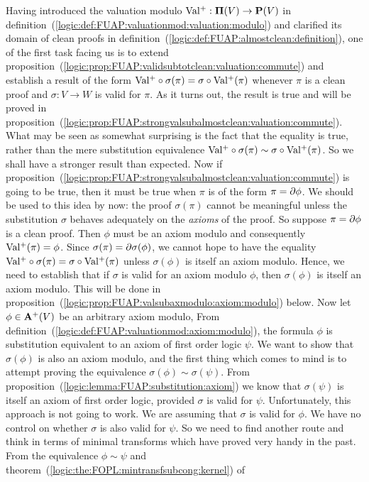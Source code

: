 Having introduced the valuation modulo $\mbox{$\rm Val^{+}$}:\mbox{${\bf\Pi}(V)$}\to\mbox{${\bf P}(V)$}$ in
definition~(\ref{logic:def:FUAP:valuationmod:valuation:modulo}) and
clarified its domain of clean proofs in
definition~(\ref{logic:def:FUAP:almostclean:definition}), one of the
first task facing us is to extend
proposition~(\ref{logic:prop:FUAP:validsubtotclean:valuation:commute})
and establish a result of the form
$\mbox{$\rm Val^{+}$}\circ\sigma(\pi)=\sigma\circ\mbox{$\rm Val^{+}$}(\pi)$ whenever $\pi$ is a
clean proof and $\sigma:V\to W$ is valid for $\pi$. As it turns out,
the result is true and will be proved in
proposition~(\ref{logic:prop:FUAP:strongvalsubalmostclean:valuation:commute}).
What may be seen as somewhat surprising is the fact that the
equality is true, rather than the mere substitution equivalence
$\mbox{$\rm Val^{+}$}\circ\sigma(\pi)\sim\sigma\circ\mbox{$\rm Val^{+}$}(\pi)$. So we shall have a
stronger result than expected. Now if
proposition~(\ref{logic:prop:FUAP:strongvalsubalmostclean:valuation:commute})
is going to be true, then it must be true when $\pi$ is of the form
$\pi=\mbox{$\partial$}\phi$. We should be used to this idea by now: the proof
$\sigma(\pi)$ cannot be meaningful unless the substitution $\sigma$
behaves adequately on the {\em axioms} of the proof. So suppose
$\pi=\mbox{$\partial$}\phi$ is a clean proof. Then $\phi$ must be an axiom modulo
and consequently $\mbox{$\rm Val^{+}$}(\pi)=\phi$. Since
$\sigma(\pi)=\mbox{$\partial$}\sigma(\phi)$, we cannot hope to have the equality
$\mbox{$\rm Val^{+}$}\circ\sigma(\pi)=\sigma\circ\mbox{$\rm Val^{+}$}(\pi)$ unless $\sigma(\phi)$
is itself an axiom modulo. Hence, we need to establish that if
$\sigma$ is valid for an axiom modulo $\phi$, then $\sigma(\phi)$ is
itself an axiom modulo. This will be done in
proposition~(\ref{logic:prop:FUAP:valsubaxmodulo:axiom:modulo})
below. Now let $\phi\in\mbox{${\bf A}^{+}(V)$}$ be an arbitrary axiom modulo, From
definition~(\ref{logic:def:FUAP:valuationmod:axiom:modulo}), the
formula $\phi$ is substitution equivalent to an axiom of first order
logic $\psi$. We want to show that $\sigma(\phi)$ is also an axiom
modulo, and the first thing which comes to mind is to attempt
proving the equivalence $\sigma(\phi)\sim\sigma(\psi)$. From
proposition~(\ref{logic:lemma:FUAP:substitution:axiom}) we know that
$\sigma(\psi)$ is itself an axiom of first order logic, provided
$\sigma$ is valid for $\psi$. Unfortunately, this approach is not
going to work. We are assuming that $\sigma$ is valid for $\phi$. We
have no control on whether $\sigma$ is also valid for $\psi$. So we
need to find another route and think in terms of minimal transforms
which have proved very handy in the past. From the equivalence
$\phi\sim\psi$ and
theorem~(\ref{logic:the:FOPL:mintransfsubcong:kernel}) of
